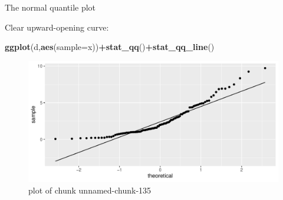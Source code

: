 \documentclass[ignorenonframetext,]{beamer}
\newenvironment{Shaded}{\begin{snugshade}}{\end{snugshade}}
\newcommand{\DataTypeTok}[1]{\textcolor[rgb]{0.13,0.29,0.53}{#1}}
\newcommand{\KeywordTok}[1]{\textcolor[rgb]{0.13,0.29,0.53}{\textbf{#1}}}
\newcommand{\NormalTok}[1]{#1}
\newcommand{\OperatorTok}[1]{\textcolor[rgb]{0.81,0.36,0.00}{\textbf{#1}}}
\begin{document}
\begin{frame}[fragile]{The normal quantile plot}
\protect\hypertarget{the-normal-quantile-plot-4}{}

Clear upward-opening curve:

\begin{Shaded}
\begin{Highlighting}[]
\KeywordTok{ggplot}\NormalTok{(d,}\KeywordTok{aes}\NormalTok{(}\DataTypeTok{sample=}\NormalTok{x))}\OperatorTok{+}\KeywordTok{stat_qq}\NormalTok{()}\OperatorTok{+}\KeywordTok{stat_qq_line}\NormalTok{()}
\end{Highlighting}
\end{Shaded}

\begin{figure}
\centering
\includegraphics{figure/unnamed-chunk-135-1.pdf}
\caption{plot of chunk unnamed-chunk-135}
\end{figure}

\end{frame}
\end{document}
